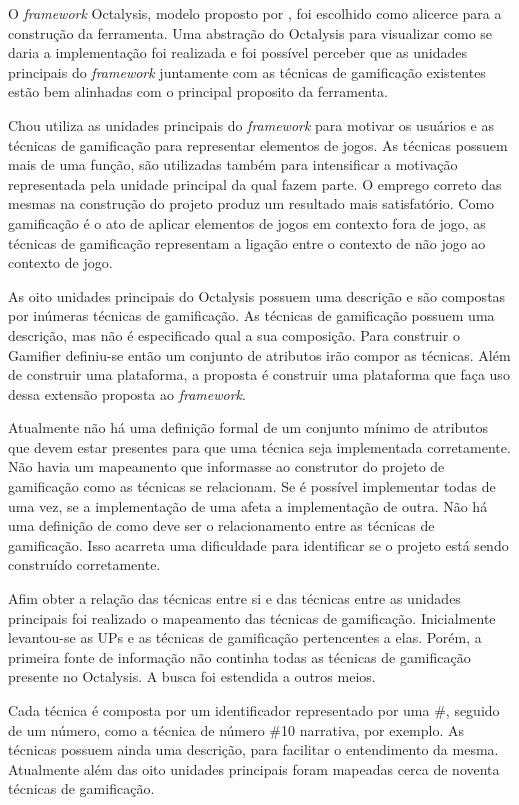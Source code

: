 O  \textit{framework} Octalysis, modelo proposto por \cite{chou2015actionable} , foi escolhido como alicerce para a construção da ferramenta.
Uma abstração do Octalysis para visualizar como se daria a implementação foi realizada e foi possível perceber que as unidades principais do \textit{framework} juntamente com as técnicas de gamificação existentes estão bem alinhadas com o principal proposito da ferramenta. 

Chou utiliza as unidades principais do \textit{framework} para motivar os usuários e as técnicas de gamificação para representar elementos de jogos. As técnicas possuem mais de uma função, são utilizadas também para intensificar a motivação representada pela unidade principal da qual fazem parte. O emprego correto das mesmas na construção do projeto produz um resultado mais satisfatório. Como gamificação é o ato de aplicar elementos de jogos em contexto fora de jogo, as técnicas de gamificação representam a ligação entre o contexto de não jogo ao contexto de jogo. 

As oito unidades principais do Octalysis possuem uma descrição e são compostas por inúmeras técnicas de gamificação. As técnicas de gamificação possuem uma descrição, mas não é especificado qual a sua composição.  Para construir o Gamifier definiu-se então um conjunto de atributos irão compor as técnicas. Além de construir uma plataforma, a proposta é construir uma plataforma que faça uso dessa extensão proposta ao \textit{framework}.

Atualmente não há uma definição formal de um conjunto mínimo de atributos que devem estar presentes para que uma técnica seja implementada corretamente. Não havia um mapeamento que informasse ao construtor do projeto de gamificação como as técnicas se relacionam. Se é possível implementar todas de uma vez, se a implementação de uma afeta a implementação de outra. Não há uma definição de como deve ser o relacionamento entre as técnicas de gamificação. Isso acarreta uma dificuldade para identificar se o projeto está sendo construído corretamente. 

Afim obter a relação das técnicas entre si e das técnicas entre as unidades principais foi realizado o mapeamento das técnicas de gamificação. Inicialmente levantou-se as UPs e as técnicas de gamificação pertencentes a elas. Porém, a primeira fonte de informação não continha todas as técnicas de gamificação presente no Octalysis. A busca foi estendida a outros meios.

 Cada técnica é composta por um identificador representado por uma \#, seguido de um número, como a técnica de número \#10 narrativa, por exemplo.  As técnicas possuem ainda uma descrição, para facilitar o entendimento da mesma. Atualmente além das oito unidades principais foram mapeadas cerca de noventa técnicas de gamificação.

